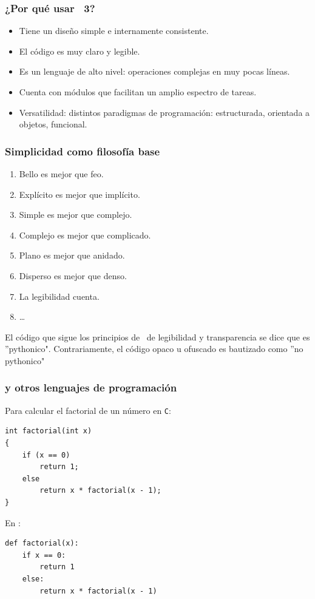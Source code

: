 \begin{frame}
\frametitle{¿Por qué usar \python\ 3?}
\begin{itemize}[<+->]
\item Tiene un diseño simple e internamente consistente.
\item El código es muy claro y legible.
\item Es un lenguaje de alto nivel: operaciones complejas en muy pocas líneas.
\item Cuenta con módulos que facilitan un amplio espectro de tareas.
\item Versatilidad: distintos paradigmas de programación: estructurada, orientada a objetos, funcional.
\end{itemize}
\end{frame}
\begin{frame}
\frametitle{Simplicidad como filosofía base}
\begin{enumerate}
\item Bello es mejor que feo.
\item Explícito es mejor que implícito.
\item Simple es mejor que complejo.
\item Complejo es mejor que complicado.
\item Plano es mejor que anidado.
\item Disperso es mejor que denso.
\item La legibilidad cuenta.
\item \ldots
\end{enumerate}
El código que sigue los principios de \python\ de legibilidad y transparencia se dice que es ''pythonico". Contrariamente, el código opaco u ofuscado es bautizado como ''no pythonico" %
\end{frame}
\begin{frame}[fragile]
\frametitle{\python y otros lenguajes de programación}
Para calcular el factorial de un número en \texttt{C}:
\begin{verbatim}
int factorial(int x)
{
    if (x == 0)
        return 1;
    else
        return x * factorial(x - 1);
}
\end{verbatim}
En \python:
\begin{verbatim}
def factorial(x):
    if x == 0:
        return 1
    else:
        return x * factorial(x - 1)
\end{verbatim}

\end{frame}
